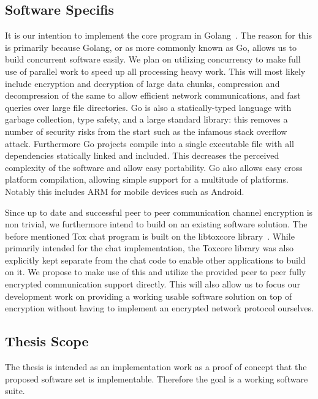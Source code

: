 \documentclass[a4paper,10pt,twoside]{article}
\begin{document}
\subsection{Software Specifis}

It is our intention to implement the core program in Golang~\cite{web:site:golang}.
The reason for this is primarily because Golang, or as more commonly known as Go, allows us to build concurrent software easily.
We plan on utilizing concurrency to make full use of parallel work to speed up all processing heavy work.
This will most likely include encryption and decryption of large data chunks, compression and decompression of the same to allow efficient network communications, and fast queries over large file directories.
Go is also a statically-typed language with garbage collection, type safety, and a large standard library: this removes a number of security risks from the start such as the infamous stack overflow attack.
Furthermore Go projects compile into a single executable file with all dependencies statically linked and included.
This decreases the perceived complexity of the software and allow easy portability.
Go also allows easy cross platform compilation, allowing simple support for a multitude of platforms.
Notably this includes ARM for mobile devices such as Android.

Since up to date and successful peer to peer communication channel encryption is non trivial, we furthermore intend to build on an existing software solution.
The before mentioned Tox chat program is built on the libtoxcore library~\cite{web:site:toxcore}.
While primarily intended for the chat implementation, the Toxcore library was also explicitly kept separate from the chat code to enable other applications to build on it.
We propose to make use of this and utilize the provided peer to peer fully encrypted communication support directly.
This will also allow us to focus our development work on providing a working usable software solution on top of encryption without having to implement an encrypted network protocol ourselves.

\subsection{Thesis Scope}

The thesis is intended as an implementation work as a proof of concept that the proposed software set is implementable.
Therefore the goal is a working software suite.
\end{document}
